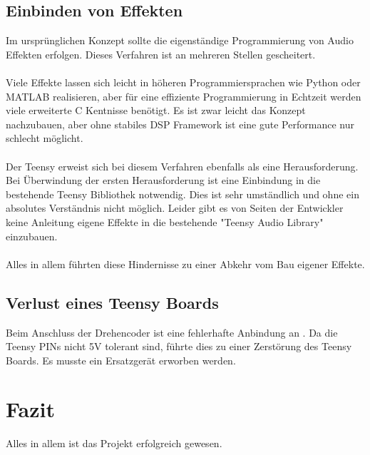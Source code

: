 \documentclass[12pt]{article}
\begin{document}
\subsection{Einbinden von Effekten}
Im ursprünglichen Konzept sollte die eigenständige Programmierung von Audio Effekten erfolgen. 
Dieses Verfahren ist an mehreren Stellen gescheitert. 
\\
\\
Viele Effekte lassen sich leicht in höheren Programmiersprachen
wie Python oder MATLAB realisieren, aber für eine effiziente Programmierung in Echtzeit werden viele erweiterte C Kentnisse benötigt. 
Es ist zwar leicht das Konzept nachzubauen, aber ohne stabiles DSP Framework ist eine gute 
Performance nur schlecht möglicht. 
\\
\\
Der Teensy erweist sich bei diesem Verfahren ebenfalls als eine Herausforderung. Bei Überwindung der ersten Herausforderung 
ist eine Einbindung in die bestehende Teensy Bibliothek notwendig. Dies ist sehr umständlich und ohne ein absolutes Verständnis nicht möglich. 
Leider gibt es von Seiten der Entwickler keine Anleitung eigene Effekte in die bestehende "Teensy Audio Library" einzubauen. 
\\
\\
Alles in allem führten diese Hindernisse zu einer Abkehr vom Bau eigener Effekte.  
\subsection{Verlust eines Teensy Boards}
Beim Anschluss der Drehencoder ist eine fehlerhafte Anbindung an . 
Da die Teensy PINs nicht 5V tolerant sind, führte dies zu einer Zerstörung des Teensy Boards.
Es musste ein Ersatzgerät erworben werden. 

  
\section{Fazit}
Alles in allem ist das Projekt erfolgreich gewesen. 
\end{document}
